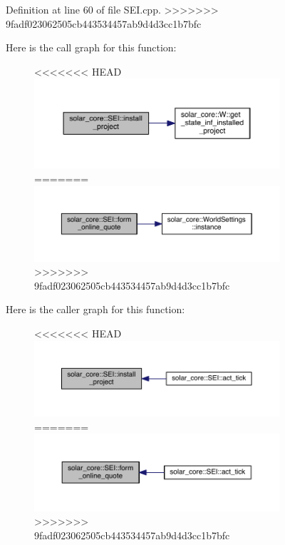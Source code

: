 \begin{figure}[H]
\begin{center}
Definition at line 60 of file S\+E\+I.\+cpp.
>>>>>>> 9fadf023062505cb443534457ab9d4d3cc1b7bfc



Here is the call graph for this function\+:
\nopagebreak
\begin{figure}[H]
\begin{center}
\leavevmode
<<<<<<< HEAD
\includegraphics[width=334pt]{classsolar__core_1_1_s_e_i_a1ab2217b83050e4320afa11c4d838fde_cgraph}
=======
\includegraphics[width=350pt]{classsolar__core_1_1_s_e_i_ad532ca9d30d5988e051b75e33ce6c241_cgraph}
>>>>>>> 9fadf023062505cb443534457ab9d4d3cc1b7bfc
\end{center}
\end{figure}




Here is the caller graph for this function\+:
\nopagebreak
\begin{figure}[H]
\begin{center}
\leavevmode
<<<<<<< HEAD
\includegraphics[width=350pt]{classsolar__core_1_1_s_e_i_a1ab2217b83050e4320afa11c4d838fde_icgraph}
=======
\includegraphics[width=350pt]{classsolar__core_1_1_s_e_i_ad532ca9d30d5988e051b75e33ce6c241_icgraph}
>>>>>>> 9fadf023062505cb443534457ab9d4d3cc1b7bfc
\end{center}
\end{figure}



\end{center}
\end{figure}
